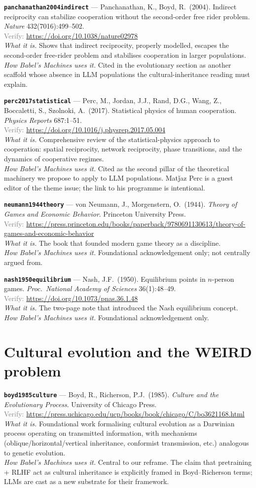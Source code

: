 \documentclass[11pt,a4paper]{article}
\newcommand{\entry}[5]{%
  \par\smallskip
  \noindent\textbf{\texttt{#1}} --- #2\\
  {\footnotesize \textcolor{gray}{Verify:} \url{#3}}\\
  \textit{What it is.} #4\\
  \textit{How Babel's Machines uses it.} #5
  \par\medskip
}
\begin{document}
\entry{panchanathan2004indirect}
{Panchanathan, K., Boyd, R.\ (2004). Indirect reciprocity can stabilize cooperation without the second-order free rider problem. \emph{Nature} 432(7016):499--502.}
{https://doi.org/10.1038/nature02978}
{Shows that indirect reciprocity, properly modelled, escapes the second-order free-rider problem and stabilises cooperation in larger populations.}
{Cited in the evolutionary section as another scaffold whose absence in LLM populations the cultural-inheritance reading must explain.}

\entry{perc2017statistical}
{Perc, M., Jordan, J.J., Rand, D.G., Wang, Z., Boccaletti, S., Szolnoki, A.\ (2017). Statistical physics of human cooperation. \emph{Physics Reports} 687:1--51.}
{https://doi.org/10.1016/j.physrep.2017.05.004}
{Comprehensive review of the statistical-physics approach to cooperation: spatial reciprocity, network reciprocity, phase transitions, and the dynamics of cooperative regimes.}
{Cited as the second pillar of the theoretical machinery we propose to apply to LLM populations. Mat\v{j}az Perc is a guest editor of the theme issue; the link to his programme is intentional.}

\entry{neumann1944theory}
{von Neumann, J., Morgenstern, O.\ (1944). \emph{Theory of Games and Economic Behavior}. Princeton University Press.}
{https://press.princeton.edu/books/paperback/9780691130613/theory-of-games-and-economic-behavior}
{The book that founded modern game theory as a discipline.}
{Foundational acknowledgement only; not centrally argued from.}

\entry{nash1950equilibrium}
{Nash, J.F.\ (1950). Equilibrium points in $n$-person games. \emph{Proc.\ National Academy of Sciences} 36(1):48--49.}
{https://doi.org/10.1073/pnas.36.1.48}
{The two-page note that introduced the Nash equilibrium concept.}
{Foundational acknowledgement only.}

\section{Cultural evolution and the WEIRD problem}

\entry{boyd1985culture}
{Boyd, R., Richerson, P.J.\ (1985). \emph{Culture and the Evolutionary Process}. University of Chicago Press.}
{https://press.uchicago.edu/ucp/books/book/chicago/C/bo3621168.html}
{Foundational work formalising cultural evolution as a Darwinian process operating on transmitted information, with mechanisms (oblique/horizontal/vertical inheritance, conformist transmission, etc.) analogous to genetic evolution.}
{Central to our reframe. The claim that pretraining + RLHF act as cultural inheritance is explicitly framed in Boyd--Richerson terms; LLMs are cast as a new substrate for their framework.}
\end{document}
